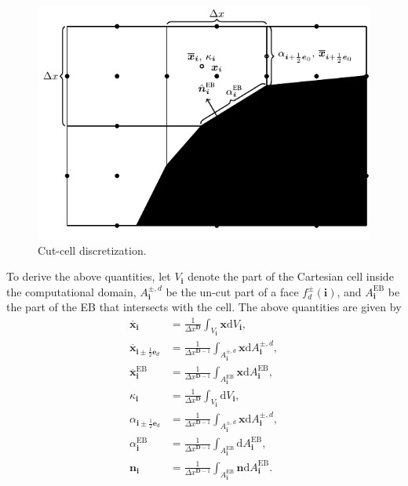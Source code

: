 \documentclass[3p]{elsarticle}
\def\diff{\ensuremath{\text{d}}}
\def\bmi{\ensuremath{\bm{i}}}
\begin{document}
\begin{figure}[ht]
  \centering
  \includegraphics{./figures/spatial_discretization}
  \caption{Cut-cell discretization.}
  \label{fig:spatial_discretization}
\end{figure}

To derive the above quantities, let $V_{\bmi}$ denote the part of the Cartesian cell inside the computational domain, $A_{\bmi}^{\pm, d}$ be the un-cut part of a face $f^{\pm}_d(\bmi)$, and $A_{\bmi}^{\text{EB}}$ be the part of the EB that intersects with the cell. The above quantities are given by
\begin{subequations}
  \begin{align}
    \overline{\bm{x}}_{\bmi} &= \frac{1}{\Delta x^{\bm{D}}}\int_{V_{\bmi}}\bm{x}\diff V_{\bmi},\\
    \overline{\bm{x}}_{\bmi\pm\frac{1}{2}\bm{e}_d} &= \frac{1}{\Delta x^{\bm{D}-1}}\int_{A_{\bmi}^{\pm, d}}\bm{x}\diff A_{\bmi}^{\pm, d},\\
    \overline{\bm{x}}_{\bmi}^{\text{EB}} &= \frac{1}{\Delta x^{\bm{D}-1}}\int_{A_{\bmi}^{\text{EB}}}\bm{x}\diff A_{\bmi}^{\text{EB}}, \\
    \kappa_{\bmi} &= \frac{1}{\Delta x^{\bm{D}}}\int_{V_{\bmi}}\diff V_{\bmi},\\
    \alpha_{\bmi\pm\frac{1}{2}\bm{e}_d} &= \frac{1}{\Delta x^{\bm{D}-1}}\int_{A_{\bmi}^{\pm, d}}\bm{x}\diff A_{\bmi}^{\pm, d},\\
    \alpha_{\bmi}^{\text{EB}} &= \frac{1}{\Delta x^{\bm{D}-1}}\int_{A_{\bmi}^{\text{EB}}}\diff A_{\bmi}^{\text{EB}}, \\
    \bm{n}_{\bmi} &= \frac{1}{\Delta x^{\bm{D}-1}}\int_{A_{\bmi}^{\text{EB}}}\bm{n}\diff A_{\bmi}^{\text{EB}}.
  \end{align}
\end{subequations}
\end{document}
